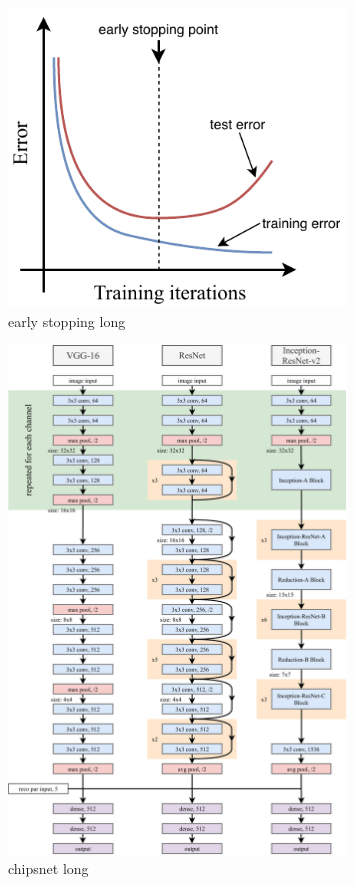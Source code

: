 \begin{figure}
    \includegraphics[width=0.8\textwidth]{diagrams/6-cvn/early_stopping.pdf}
    \caption[early stopping short]
    {early stopping long}
    \label{fig:early_stopping}
\end{figure}

\begin{figure}
    \includegraphics[width=0.8\textwidth]{diagrams/6-cvn/chipsnet.pdf}
    \caption[chipsnet short]
    {chipsnet long}
    \label{fig:chipsnet}
\end{figure}

